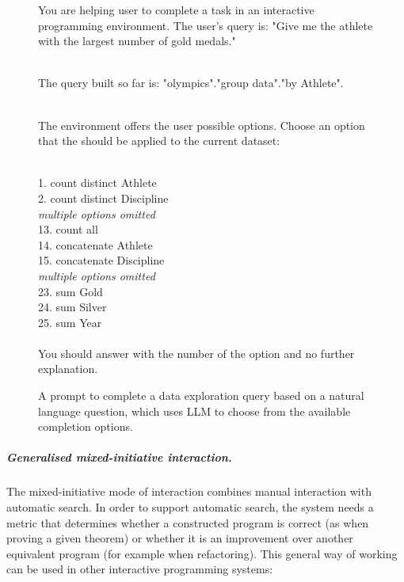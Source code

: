 \documentclass[anonymous, a4paper,UKenglish,cleveref, autoref, thm-restate]{lipics-v2021}
\begin{document}
\begin{figure}[t]
{\raggedright\ttfamily\small
You are helping user to complete a task in an interactive programming environment. The user's
query is: "Give me the athlete with the largest number of gold medals."

~\\[-0.75em]

The query built so far is: "olympics"."group data"."by Athlete".

~\\[-0.75em]

The environment offers the user possible options. Choose an option that the should be applied to the current dataset:

~\\[-0.75em]

1.\hspace{0.4em} count distinct Athlete\\
2.\hspace{0.4em} count distinct Discipline\\
\hspace{2.3em}\lbrack\textit{multiple options omitted}\rbrack \\
13. count all\\
14. concatenate Athlete\\
15. concatenate Discipline\\
\hspace{2.3em}\lbrack\textit{multiple options omitted}\rbrack\\
23. sum Gold\\
24. sum Silver\\
25. sum Year\\

~\\[-0.75em]

You should answer with the number of the option and no further explanation.}
\caption{A prompt to complete a data exploration query based on a natural language
question, which uses LLM to choose from the available completion options.}
\label{fig:llm}
\end{figure}


\subparagraph{Generalised mixed-initiative interaction.}
The mixed-initiative mode of interaction combines manual interaction with automatic search.
In order to support automatic search, the system needs a metric that determines whether a
constructed program is correct (as when proving a given theorem) or whether it is an improvement
over another equivalent program (for example when refactoring). This general way of working
can be used in other interactive programming systems:
\end{document}
